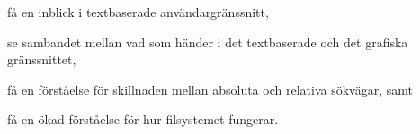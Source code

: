 \item få en inblick i textbaserade användargränssnitt,
\item se sambandet mellan vad som händer i det textbaserade och det
	grafiska gränssnittet,
\item få en förståelse för skillnaden mellan absoluta och relativa
	sökvägar, samt
\item få en ökad förståelse för hur filsystemet fungerar.
